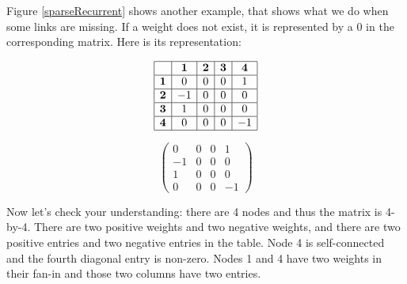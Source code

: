 Figure \ref{sparseRecurrent} shows another example, that shows what we do when some links are missing. If a weight does not exist, it is represented by a $0$ in the corresponding matrix. Here is its representation:

\begin{minipage}{0.5\textwidth}
\centering
\[
\begin{array}{|c|c|c|c|c|}
\hline
\multicolumn{1}{|c|}{} & \textbf{1} & \textbf{2}  & \textbf{3} & \textbf{4} \\
\hline
\textbf{1} & 0 & 0 & 0 & 1 \\
\hline
\textbf{2} & -1 & 0 & 0 & 0 \\
\hline
\textbf{3} & 1 & 0 & 0 & 0 \\
\hline
\textbf{4} & 0 & 0 & 0 & -1 \\
\hline
\end{array}
\]
\end{minipage}
\begin{minipage}{0.5\textwidth}
\centering
\[
\begin{pmatrix}
0 & 0 & 0 & 1 \\
-1 & 0 & 0 & 0 \\
1 & 0 & 0 & 0 \\
0 & 0 & 0 & -1
\end{pmatrix}
\]
\end{minipage}
\vspace*{.1cm} 

\noindent Now let's check your understanding: there are 4 nodes and thus the matrix is 4-by-4. There are two positive weights and two negative weights, and there are two positive entries and two negative entries in the table. Node 4 is self-connected and the fourth diagonal entry is non-zero. Nodes 1 and 4 have two weights in their fan-in and those two columns have two entries.

